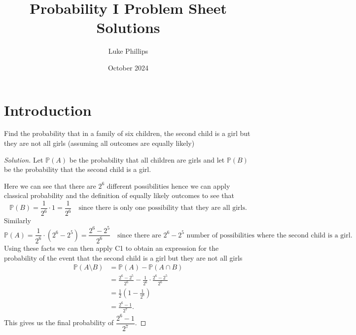 \documentclass[10pt, a4paper]{article}
\title{Probability I Problem Sheet Solutions}
\author{Luke Phillips}
\date{October 2024}
\newcommand{\Po}{\mathbb{P}}
\begin{document}
\maketitle

\newpage

\section{Introduction}

\begin{problem}[35]
    Find the probability that in a family of six children, the second child is a girl but they are not all girls (assuming all outcomes are equally likely)
    
    \begin{proof}[Solution]\renewcommand{\qedsymbol}{}
        Let $\Po(A)$ be the probability that all children are girls and let $\Po(B)$ be the probability that the second child is a girl.

        Here we can see that there are $2 ^ 6$ different possibilities hence we can apply classical probability and the definition of equally likely outcomes to see that
        \[
        \Po(B) = \frac{1}{2 ^ 6} \cdot 1 = \frac{1}{2 ^ 6}\quad\text{since there is only one possibility that they are all girls.}
        \]
        Similarly
        \[
        \Po(A) = \frac{1}{2 ^ 6} \cdot (2 ^ 6 - 2 ^ 5) = \frac{2 ^ 6 - 2 ^  5}{2 ^ 6}\quad\text{since there are $2 ^ 6 - 2 ^ 5$ number of possibilities where the second child is a girl.}
        \]
        Using these facts we can then apply C1 to obtain an expression for the probability of the event that the second child is a girl but they are not all girls
        \begin{align*}
            \Po(A \setminus B) &= \Po(A) - \Po(A \cap B) \\
            &= \frac{2 ^ 6 - 2 ^ 5}{2 ^ 6} - \frac{1}{2 ^ 6} \cdot \frac{2 ^ 6 - 2 ^ 5}{2 ^ 6} \\
            &= \frac{1}{2}\left(1 - \frac{1}{2 ^ 6}\right) \\
            &= \frac{2 ^ 6 - 1}{2 ^ 7}.
        \end{align*}
        This gives us the final probability of $\dfrac{2 ^ 6 - 1}{2 ^ 7}$.
    \end{proof}
\end{problem}
\end{document}
